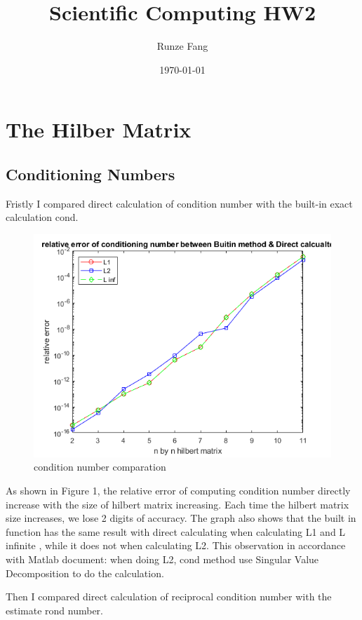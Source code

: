 \documentclass[a4paper]{article}
\title{Scientific Computing HW2}
\author{Runze Fang}
\date{\today}
\begin{document}
\maketitle
\section{The Hilber Matrix}
\subsection{Conditioning Numbers}
Fristly I compared direct calculation of condition number with the built-in exact calculation cond.

\begin{figure}[H] 
\centering 
\includegraphics[width=1.0\textwidth]{1.1-1.png}
\caption{condition number comparation} 
\label{Fig.1.1-1} 
\end{figure}

As shown in  Figure 1, the relative error of computing condition number directly increase with the size of hilbert
matrix increasing. Each time the hilbert matrix size increases, we lose 2 digits of accuracy. The graph also shows
that the built in function has the same result with direct calculating when calculating L1 and L infinite
, while it does not when calculating L2. This observation in accordance with Matlab document: when doing L2, cond
method use Singular Value Decomposition to do the calculation.

\indent Then I compared direct calculation of reciprocal condition number with the estimate rond number.
\end{document}
